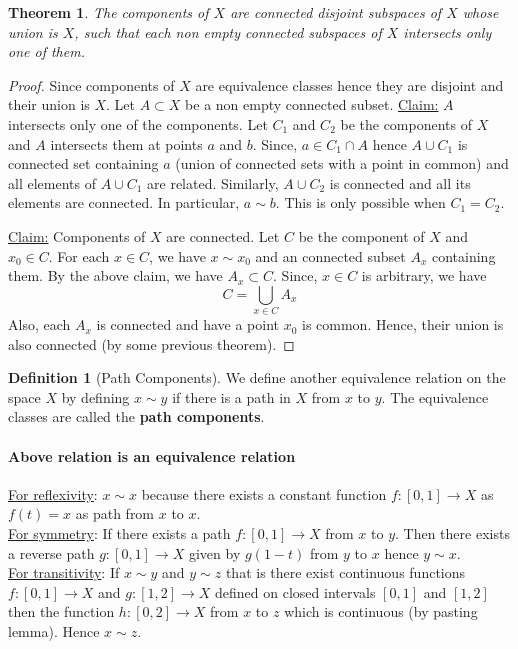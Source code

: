\documentclass[12pt,reqno]{amsart}
\theoremstyle{plain}
\newtheorem{thm}{Theorem}
\theoremstyle{definition}
\newtheorem{defn}{Definition}
\begin{document}
\begin{thm}
    The components of $X$ are connected disjoint subspaces of $X$ whose union is $X$, such that each non empty connected subspaces of $X$ intersects only one of them.
\end{thm}
\begin{proof}
    Since components of $X$ are equivalence classes hence they are disjoint and their union is $X$. Let $A \subset X$ be a non empty connected subset. \underline{Claim:} $A$ intersects only one of the components. Let $C_1$ and $C_2$ be the components of $X$ and $A$ intersects them at points $a$ and $b$. Since, $a \in C_1 \cap A$ hence $A \cup C_1$ is connected set containing $a$ (union of connected sets with a point in common) and all elements of $A \cup C_1$ are related. Similarly, $A \cup C_2$ is connected and all its elements are connected. In particular, $a \sim b$. This is only possible when $C_1 = C_2$.
    
    \underline{Claim:} Components of $X$ are connected. Let $C$ be the component of $X$ and $x_0 \in C$. For each $x \in C$, we have $x \sim x_0$ and an connected subset $A_x$ containing them. By the above claim, we have $A_x \subset C$. Since, $x \in C$ is arbitrary, we have
    $$ C = \bigcup_{x \in C} A_x$$
    Also, each $A_x$ is connected and have a point $x_0$ is common. Hence, their union is also connected (by some previous theorem). 
\end{proof}

\begin{defn}[Path Components]
    We define another equivalence relation on the space $X$ by defining $x \sim y$ if there is a path in $X$ from $x$ to $y$. The equivalence classes are called the {\bf path components}.
\end{defn}
\paragraph{{\bf Above relation is an equivalence relation}}
\underline{For reflexivity}: $x \sim x$ because there exists a constant function $f:[0,1] \to X$ as $f(t) = x$ as path from $x$ to $x$. \\
\underline{For symmetry}: If there exists a path $f \colon [0,1] \to X$ from $x$ to $y$. Then there exists a reverse path $g\colon[0,1] \to X$ given by $g(1-t)$ from $y$ to $x$ hence $y \sim x$.\\
\underline{For transitivity}: If $x \sim y$ and $y \sim z$ that is there exist continuous functions $f\colon [0,1] \to X$ and $g\colon [1,2] \to X$ defined on closed intervals $[0,1]$ and $[1,2]$ then the function $h\colon[0,2] \to X$ from $x$ to $z$ which is continuous (by pasting lemma). Hence $x \sim z$.
\end{document}
